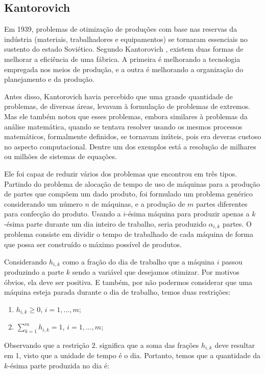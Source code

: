 \subsection{Kantorovich}

Em 1939, problemas de otimização de produções com base nas reservas da indústria (materiais,
trabalhadores e equipamentos) se tornaram essenciais no sustento do estado Soviético.
Segundo Kantorovich \cite{kantorovich1939}, existem duas formas de melhorar a eficiência
de uma fábrica. A primeira é melhorando a tecnologia empregada nos meios de produção, e a
outra é melhorando a organização do planejamento e da produção.

Antes disso, Kantorovich havia percebido que uma grande quantidade de problemas, de diversas
áreas, levavam à formulação de problemas de extremos. Mas ele também notou que esses problemas,
embora similares à problemas da análise matemática, quando se tentava resolver
usando os mesmos processos matemáticos, formalmente definidos, se tornavam inúteis, pois era
deveras custoso no aspecto computacional. Dentre um dos exemplos está a resolução de milhares
ou milhões de sistemas de equações.

Ele foi capaz de reduzir vários dos problemas que encontrou em três tipos.
Partindo do problema de alocação de tempo de uso de máquinas para a produção de partes que compõem
um dado produto, foi formulado um problema genérico considerando um número
\(n\) de máquinas, e a produção de \(m\) partes diferentes para confecção do produto. Usando
a \(i\)-ésima máquina para produzir apenas a \(k\)-ésima parte durante um dia inteiro de trabalho,
seria produzido \(\alpha_{i, k}\) partes. O problema consiste em dividir o tempo de trabalhado de cada
máquina de forma que possa ser construído o máximo possível de produtos.


Considerando \(h_{i, k}\) como a fração do dia de trabalho que a máquina \(i\) passou produzindo
a parte \(k\) sendo a variável que desejamos otimizar. Por motivos óbvios, ela deve ser positiva.
E também, por não podermos considerar que uma máquina esteja parada durante o dia de trabalho, temos
duas restrições:

\begin{enumerate}
  \item \(h_{i, k} \geq 0\), \(i =1, ..., m \);
  \item \(\sum_{k=1}^m h_{i, k} = 1\), \(i =1, ..., m \);
  \label{restricoes_a}
\end{enumerate}

Observando que a restrição \(2.\) significa que a soma das frações \(h_{i, k}\) deve resultar
em 1, visto que a unidade de tempo é o dia. Portanto, temos que a quantidade da \(k\)-ésima parte
produzida no dia é:

